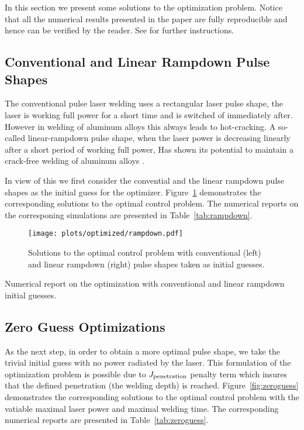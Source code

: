In this section we present some solutions to the optimization problem. Notice that all the numerical results presented in the paper are fully reproducible and hence can be verified by the reader. See \cite{optcontrol_github} for further instructions. 

\subsection{Conventional and Linear Rampdown Pulse Shapes}

The conventional pulse laser welding uses a rectangular laser pulse shape, \ie the laser is working full power for a short time and is switched of immediately after. However in welding of aluminum alloys this always leads to hot-cracking. A so-called linear-rampdown pulse shape, \ie when the laser power is decreasing linearly after a short period of working full power, Has shown its potential to maintain a crack-free welding of aluminum alloys .

In view of this we first consider the convential and the linear rampdown pulse shapes as the initial guess for the optimizer. Figure~\ref{fig:rampdown} demonstrates the corresponding solutions to the optimal control problem. The numerical reports on the corresponing simulations are presented in Table~\ref{tab:rampdown}.

\begin{figure} \label{fig:rampdown}
	\centering
	\texttt{[image: plots/optimized/rampdown.pdf]}
	\caption{Solutions to the optimal control problem with conventional (left) and linear rampdown (right) pulse shapes taken as initial guesses.}
\end{figure}

\begin{table} \label{tab:rampdown}
	\centering
	
	\caption{Numerical report on the optimization with conventional and linear rampdown initial guesses.}
\end{table}


\subsection{Zero Guess Optimizations}

As the next step, in order to obtain a more optimal pulse shape, we take the trivial initial guess with no power radiated by the laser. This formulation of the optimization problem is possible due to $J_\textup{penetration}$ penalty term which insures that the defined penetration (\ie the welding depth) is reached. Figure~\ref{fig:zeroguess} demonstrates the corresponding solutions to the optimal control problem with the vatiable maximal laser power and maximal welding time. The corresponding numerical reports are presented in Table~\ref{tab:zeroguess}.

